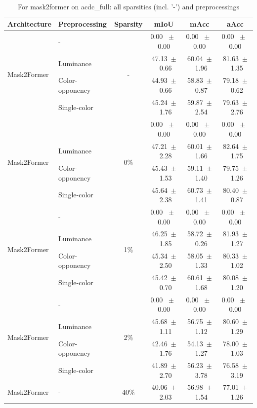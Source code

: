 \begin{table}[h]
  \centering
  \caption{For mask2former on acdc_full: all sparsities (incl. '-') and preprocessings}
  \begin{tabular}{@{}l l c c c c@{}}
    \toprule
    Architecture & Preprocessing & Sparsity & mIoU & mAcc & aAcc \\
    \midrule
    \multirow{4}{*}{Mask2Former} & - & \multirow{4}{*}{-} & 0.00 ~$\pm$~ 0.00 & 0.00 ~$\pm$~ 0.00 & 0.00 ~$\pm$~ 0.00 \\
    & Luminance &  & 47.13~$\pm$~0.66 & 60.04~$\pm$~1.96 & 81.63~$\pm$~1.35 \\
    & Color-opponency &  & 44.93~$\pm$~0.66 & 58.83~$\pm$~0.87 & 79.18~$\pm$~0.62 \\
    & Single-color &  & 45.24~$\pm$~1.76 & 59.87~$\pm$~2.54 & 79.63~$\pm$~2.76 \\
    \midrule
    \multirow{4}{*}{Mask2Former} & - & \multirow{4}{*}{0\%} & 0.00 ~$\pm$~ 0.00 & 0.00 ~$\pm$~ 0.00 & 0.00 ~$\pm$~ 0.00 \\
    & Luminance &  & 47.21~$\pm$~2.28 & 60.01~$\pm$~1.66 & 82.64~$\pm$~1.75 \\
    & Color-opponency &  & 45.43~$\pm$~1.53 & 59.11~$\pm$~1.40 & 79.75~$\pm$~1.26 \\
    & Single-color &  & 45.64~$\pm$~2.38 & 60.73~$\pm$~1.41 & 80.40~$\pm$~0.87 \\
    \midrule
    \multirow{4}{*}{Mask2Former} & - & \multirow{4}{*}{1\%} & 0.00 ~$\pm$~ 0.00 & 0.00 ~$\pm$~ 0.00 & 0.00 ~$\pm$~ 0.00 \\
    & Luminance &  & 46.25~$\pm$~1.85 & 58.72~$\pm$~0.26 & 81.93~$\pm$~1.27 \\
    & Color-opponency &  & 45.34~$\pm$~2.50 & 58.05~$\pm$~1.33 & 80.33~$\pm$~1.02 \\
    & Single-color &  & 45.42~$\pm$~0.70 & 60.61~$\pm$~1.68 & 80.08~$\pm$~1.20 \\
    \midrule
    \multirow{4}{*}{Mask2Former} & - & \multirow{4}{*}{2\%} & 0.00 ~$\pm$~ 0.00 & 0.00 ~$\pm$~ 0.00 & 0.00 ~$\pm$~ 0.00 \\
    & Luminance &  & 45.68~$\pm$~1.11 & 56.75~$\pm$~1.12 & 80.60~$\pm$~1.29 \\
    & Color-opponency &  & 42.46~$\pm$~1.76 & 54.13~$\pm$~1.27 & 78.00~$\pm$~1.03 \\
    & Single-color &  & 41.89~$\pm$~2.70 & 56.23~$\pm$~3.78 & 76.58~$\pm$~3.19 \\
    \midrule
    \multirow{4}{*}{Mask2Former} & - & \multirow{4}{*}{40\%} & 40.06~$\pm$~2.03 & 56.98~$\pm$~1.54 & 77.01~$\pm$~1.26 \\

\end{tabular}
\end{table}
